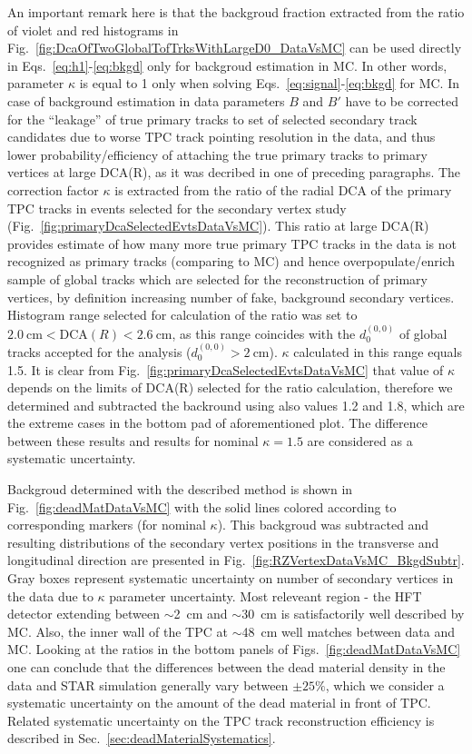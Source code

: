 An important remark here is that the backgroud fraction extracted from the ratio of violet and red histograms in Fig.~\ref{fig:DcaOfTwoGlobalTofTrksWithLargeD0_DataVsMC} can be used directly in Eqs.~\eqref{eq:h1}-\eqref{eq:bkgd} only for backgroud estimation in MC. In other words, parameter $\kappa$ is equal to 1 only when solving Eqs.~\eqref{eq:signal}-\eqref{eq:bkgd} for MC. In case of background estimation in data parameters $B$ and $B'$ have to be corrected for the ``leakage'' of true primary tracks to set of selected secondary track candidates due to worse TPC track pointing resolution in the data, and thus lower probability/efficiency of attaching the true primary tracks to primary vertices at large DCA(R), as it was decribed in one of preceding paragraphs. The correction factor $\kappa$ is extracted from the ratio of the radial DCA of the primary TPC tracks in events selected for the secondary vertex study (Fig.~\ref{fig:primaryDcaSelectedEvtsDataVsMC}). This ratio at large DCA(R) provides estimate of how many more true primary TPC tracks in the data is not recognized as primary tracks (comparing to MC) and hence overpopulate/enrich sample of global tracks which are selected for the reconstruction of primary vertices, by definition increasing number of fake, background secondary vertices. Histogram range selected for calculation of the ratio was set to $2.0~\text{cm}<\text{DCA}(R)<2.6~\text{cm}$, as this range coincides with the $d_{0}^{(0,0)}$ of global tracks accepted for the analysis ($d_{0}^{(0,0)}>2~\text{cm}$). $\kappa$ calculated in this range equals 1.5. It is clear from Fig.~\ref{fig:primaryDcaSelectedEvtsDataVsMC} that value of $\kappa$ depends on the limits of DCA(R) selected for the ratio calculation, therefore we determined and subtracted the backround using also values 1.2 and 1.8, which are the extreme cases in the bottom pad of aforementioned plot. The difference between these results and results for nominal $\kappa=1.5$ are considered as a systematic uncertainty.

Backgroud determined with the described method is shown in Fig.~\ref{fig:deadMatDataVsMC} with the solid lines colored according to corresponding markers (for nominal $\kappa$). This backgroud was subtracted and resulting distributions of the secondary vertex positions in the transverse and longitudinal direction are presented in Fig.~\ref{fig:RZVertexDataVsMC_BkgdSubtr}. Gray boxes represent systematic uncertainty on number of secondary vertices in the data due to $\kappa$ parameter uncertainty. Most releveant region - the HFT detector extending between $\sim$2~cm and $\sim$30~cm is satisfactorily well described by MC. Also, the inner wall of the TPC at $\sim$48~cm well matches between data and MC. Looking at the ratios in the bottom panels of Figs.~\ref{fig:deadMatDataVsMC} one can conclude that the differences between the dead material density in the data and STAR simulation generally vary between $\pm25\%$, which we consider a systematic uncertainty on the amount of the dead material in front of TPC. Related systematic uncertainty on the TPC track reconstruction efficiency is described in Sec.~\ref{sec:deadMaterialSystematics}.



